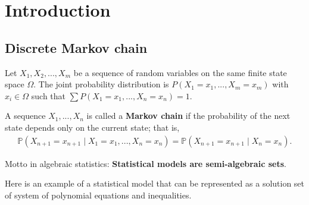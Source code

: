 \documentclass[a4paper, 11pt]{article}
\begin{document}
\maketitle
\tableofcontents

\clearpage

\section{Introduction}

\subsection{Discrete Markov chain}


Let \( X_1, X_2, ..., X_m \) be a sequence of random variables on the same finite state space \( \Omega \). The joint probability distribution is \( P (X_1 = x_1, ..., X_m = x_m) 
\) with \( x_i \in \Omega \) such that \( \sum P(X_1 = x_1,...,X_n = x_n) = 1 \).

\begin{defi}
  A sequence \( X_1, ..., X_n \) is called a \textbf{Markov chain} if the probability of the next state depends only on the current state; that is,
  \begin{align*}
    \mathbb P (X_{n+1} = x_{n+1} \mid X_1 = x_1, ..., X_n = x_n) = \mathbb P (X_{n+1} = x_{n+1} \mid X_n = x_n).
  \end{align*}
\end{defi}


\begin{mdframed}
  Motto in algebraic statistics: \textbf{Statistical models are semi-algebraic sets}.
\end{mdframed}

Here is an example of a statistical model that can be represented as a solution set of system of polynomial equations and inequalities.
\end{document}
